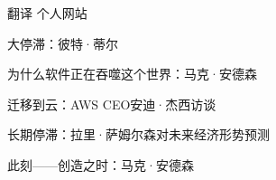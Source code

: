 

\begin{cventries}

  \cventry
    {翻译} %
    {个人网站} %
    {} %
    {} %
    {
      \begin{cvitems} %
        \item {大停滞：彼特·蒂尔}
        \item {为什么软件正在吞噬这个世界：马克·安德森}
        \item {迁移到云：AWS CEO安迪·杰西访谈}
        \item {长期停滞：拉里·萨姆尔森对未来经济形势预测}
        \item {此刻——创造之时：马克·安德森}
      \end{cvitems}
    }

\end{cventries}
